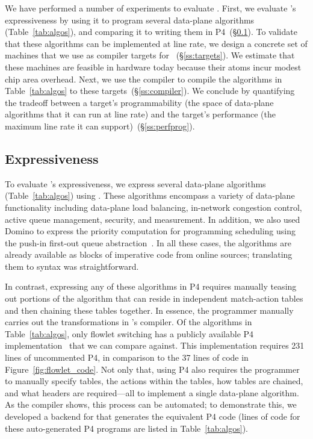 We have performed a number of experiments to evaluate \pktlanguage. 
First, we evaluate \pktlanguage's expressiveness by using it to program several
data-plane algorithms (Table~\ref{tab:algos}), and comparing it to writing them
in P4~(\S\ref{ss:expressiveness}).  To validate that these algorithms can be
implemented at line rate, we design a concrete set of \absmachine machines that
we use as compiler targets for \pktlanguage~(\S\ref{ss:targets}).  We estimate
that these machines are feasible in hardware today because their atoms incur
modest chip area overhead. Next, we use the \pktlanguage compiler to compile
the algorithms in Table~\ref{tab:algos} to these targets~(\S\ref{ss:compiler}).
We conclude by quantifying the tradeoff between a target's programmability (the
space of data-plane algorithms that it can run at line rate) and the target's
performance (the maximum line rate it can support)~(\S\ref{ss:perfprog}).

\subsection{Expressiveness}
\label{ss:expressiveness}

To evaluate \pktlanguage's expressiveness, we express several data-plane
algorithms (Table~\ref{tab:algos}) using \pktlanguage. These algorithms
encompass a variety of data-plane functionality including data-plane load
balancing, in-network congestion control, active queue management, security,
and measurement. In addition, we also used Domino to express the priority
computation for programming scheduling using the push-in first-out queue
abstraction~\cite{pifo_hotnets}. In all these cases, the algorithms are
already available as blocks of imperative code from online sources; 
translating them to \pktlanguage syntax
was straightforward.

In contrast, expressing any of these algorithms in P4 requires manually teasing
out portions of the algorithm that can reside in independent match-action
tables and then chaining these tables together. In essence, the programmer
manually carries out the transformations in \pktlanguage's compiler. Of the
algorithms in Table~\ref{tab:algos}, only flowlet switching has a publicly
available P4 implementation~\cite{p4_flowlet} that we can compare against. This
implementation requires 231 lines of uncommented P4, in comparison to the 37
lines of \pktlanguage code in Figure~\ref{fig:flowlet_code}. Not only that,
using P4 also requires the programmer to manually specify tables, the actions
within the tables, how tables are chained, and what headers are required---all
to implement a single data-plane algorithm. As the \pktlanguage compiler shows,
this process can be automated; to demonstrate this, we developed a backend for
\pktlanguage that generates the equivalent P4 code (lines of code for these auto-generated P4
programs are listed in Table~\ref{tab:algos}).

